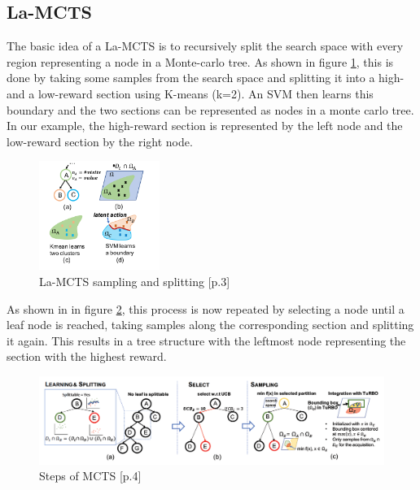 \documentclass[bibliography=totoc]{scrartcl}
\begin{document}
\newpage
\subsection{La-MCTS}
The basic idea of a \ac{La-MCTS} is to recursively split the search space with every region representing a node in a Monte-carlo tree.\cite{La-MCTS}
As shown in figure \ref{fig:laMCTS_sampling_splitting}, this is done by taking some samples from the search space and splitting it into a high- and a low-reward section using K-means (k=2). 
An \ac{SVM} then learns this boundary and the two sections can be represented as nodes in a monte carlo tree.
In our example, the high-reward section is represented by the left node and the low-reward section by the right node.


\begin{figure}[H]
	\centering
	\includegraphics[width = {0.35\textwidth}]{img/lamcts_1.png}
	\caption{\ac{La-MCTS} sampling and splitting \cite{La-MCTS}[p.3]}
	\label{fig:laMCTS_sampling_splitting}
\end{figure}
As shown in in figure \ref{fig:laMCTS_workflow}, this process is now repeated by selecting a node until a leaf node is reached, taking samples along the corresponding section and splitting it again. 
This results in a tree structure with the leftmost node representing the section with the highest reward. 

\begin{figure}[H]
	\centering
	\includegraphics[width = {\textwidth}]{img/lamcts_workflow.png}
	\caption{Steps of \ac{MCTS} \cite{La-MCTS}[p.4]}
	\label{fig:laMCTS_workflow}
\end{figure}
\end{document}
